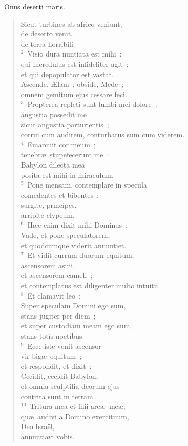 ~Onus deserti maris. \begin{flushleft}\begin{verse}\vspace{6pt}Sicut turbines ab africo veniunt,\\ de deserto venit,\\ de terra horribili.\\
${}^{2}$~Visio dura nuntiata est mihi~:\\ qui incredulus est infideliter agit~;\\ et qui depopulator est vastat.\\ Ascende, \AE lam~; obside, Mede~;\\ omnem gemitum ejus cessare feci.\\
${}^{3}$~Propterea repleti sunt lumbi mei dolore~;\\ angustia possedit me\\ sicut angustia parturientis~;\\ corrui cum audirem, conturbatus sum cum viderem.\\
${}^{4}$~Emarcuit cor meum~;\\ tenebr\ae\ stupefecerunt me~:\\ Babylon dilecta mea\\ posita est mihi in miraculum.\\
${}^{5}$~Pone mensam, contemplare in specula\\ comedentes et bibentes~:\\ surgite, principes,\\ arripite clypeum.\\
${}^{6}$~H\ae c enim dixit mihi Dominus~:\\ Vade, et pone speculatorem,\\ et quodcumque viderit annuntiet.\\
${}^{7}$~Et vidit currum duorum equitum,\\ ascensorem asini,\\ et ascensorem cameli~;\\ et contemplatus est diligenter multo intuitu.\\
${}^{8}$~Et clamavit leo~:\\ Super speculam Domini ego sum,\\ stans jugiter per diem~;\\ et super custodiam meam ego sum,\\ stans totis noctibus.\\
${}^{9}$~Ecce iste venit ascensor\\ vir big\ae\ equitum~;\\ et respondit, et dixit~:\\ Cecidit, cecidit Babylon,\\ et omnia sculptilia deorum ejus\\ contrita sunt in terram.\\
${}^{10}$~Tritura mea et filii are\ae\ me\ae ,\\ qu\ae\ audivi a Domino exercituum,\\ Deo Isra\"el,\\ annuntiavi vobis.\end{verse}\end{flushleft}


